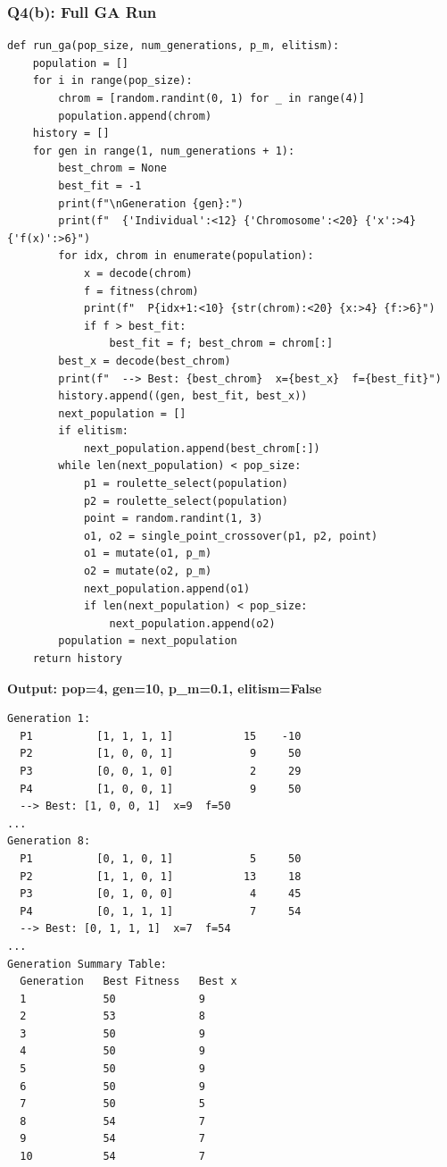 \documentclass[12pt,a4paper]{article}
\begin{document}
\subsubsection*{Q4(b): Full GA Run}

\begin{lstlisting}[style=pycode, caption={Q4(b): run\_ga}]
def run_ga(pop_size, num_generations, p_m, elitism):
    population = []
    for i in range(pop_size):
        chrom = [random.randint(0, 1) for _ in range(4)]
        population.append(chrom)
    history = []
    for gen in range(1, num_generations + 1):
        best_chrom = None
        best_fit = -1
        print(f"\nGeneration {gen}:")
        print(f"  {'Individual':<12} {'Chromosome':<20} {'x':>4} {'f(x)':>6}")
        for idx, chrom in enumerate(population):
            x = decode(chrom)
            f = fitness(chrom)
            print(f"  P{idx+1:<10} {str(chrom):<20} {x:>4} {f:>6}")
            if f > best_fit:
                best_fit = f; best_chrom = chrom[:]
        best_x = decode(best_chrom)
        print(f"  --> Best: {best_chrom}  x={best_x}  f={best_fit}")
        history.append((gen, best_fit, best_x))
        next_population = []
        if elitism:
            next_population.append(best_chrom[:])
        while len(next_population) < pop_size:
            p1 = roulette_select(population)
            p2 = roulette_select(population)
            point = random.randint(1, 3)
            o1, o2 = single_point_crossover(p1, p2, point)
            o1 = mutate(o1, p_m)
            o2 = mutate(o2, p_m)
            next_population.append(o1)
            if len(next_population) < pop_size:
                next_population.append(o2)
        population = next_population
    return history
\end{lstlisting}

\textbf{Output: pop=4, gen=10, p\_m=0.1, elitism=False}

\begin{lstlisting}[style=output]
Generation 1:
  P1          [1, 1, 1, 1]           15    -10
  P2          [1, 0, 0, 1]            9     50
  P3          [0, 0, 1, 0]            2     29
  P4          [1, 0, 0, 1]            9     50
  --> Best: [1, 0, 0, 1]  x=9  f=50
...
Generation 8:
  P1          [0, 1, 0, 1]            5     50
  P2          [1, 1, 0, 1]           13     18
  P3          [0, 1, 0, 0]            4     45
  P4          [0, 1, 1, 1]            7     54
  --> Best: [0, 1, 1, 1]  x=7  f=54
...
Generation Summary Table:
  Generation   Best Fitness   Best x
  1            50             9
  2            53             8
  3            50             9
  4            50             9
  5            50             9
  6            50             9
  7            50             5
  8            54             7
  9            54             7
  10           54             7
\end{lstlisting}
\end{document}
